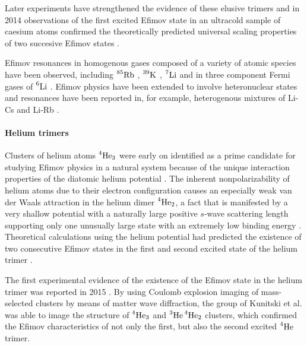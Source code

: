 Later experiments have strengthened the evidence of these elusive trimers and in 2014 observations of the first excited Efimov state in an ultracold sample of caesium atoms confirmed the theoretically predicted universal scaling properties of two succesive Efimov states \cite{Huang2014}.

Efimov resonances in homogenous gases composed of a variety of atomic species have been observed, including $\prescript{85}{}{\mathrm{Rb}}$ \cite{Klauss2017}, $\prescript{39}{}{\mathrm{K}}$ \cite{Potassium}, $\prescript{7}{}{\mathrm{Li}}$ \cite{Lithium7} and in three component Fermi gases of $\prescript{6}{}{\mathrm{Li}}$ \cite{Williams2009}. Efimov physics have been extended to involve heteronuclear states and resonances have been reported in, for example, heterogenous mixtures of Li-Cs and Li-Rb \cite{LithiumRubidium,LithiumCeasium}.

\paragraph{Helium trimers}
Clusters of helium atoms $\prescript{4}{}{\mathrm{He}}_3$ were early on identified as a prime candidate for studying Efimov physics in a natural system because of the unique interaction properties of the diatomic helium potential \cite{Lim1977}. The inherent nonpolarizability of helium atoms due to their electron configuration causes an especially weak van der Waals attraction in the helium dimer $\prescript{4}{}{\mathrm{He}}_2$, a fact that is manifested by a very shallow potential with a naturally large positive $s$-wave scattering length supporting only one unusually large state with an extremely low binding energy \cite{Blume2019}. Theoretical calculations using the helium potential had predicted the existence of two consecutive Efimov states in the first and second excited state of the helium trimer \cite{Kamimura2012}.

The first experimental evidence of the existence of the Efimov state in the helium trimer was reported in 2015 \cite{Blume2015}. By using Coulomb explosion imaging of mass-selected clusters by means of matter wave diffraction, the group of Kunitski et al. was able to image the structure of $\prescript{4}{}{\mathrm{He}}_3$ and $\prescript{3}{}{\mathrm{He}}\prescript{4}{}{\mathrm{He}}_2$ clusters, which confirmed the Efimov characteristics of not only the first, but also the second excited $\prescript{4}{}{\mathrm{He}}$ trimer. 

